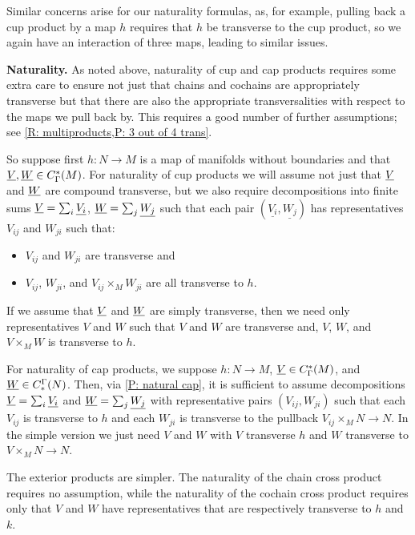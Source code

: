 Similar concerns arise for our naturality formulas, as, for example, pulling back a cup product by a map $h$ requires that $h$ be transverse to the cup product, so we again have an interaction of three maps, leading to similar issues.

\textbf{Naturality.}
As noted above, naturality of cup and cap products requires some extra care to ensure not just that chains and cochains are appropriately transverse but that there are also the appropriate transversalities with respect to the maps we pull back by.
This requires a good number of further assumptions; see \cref{R: multiproducts,P: 3 out of 4 trans}.

So suppose first $h \colon N \to M$ is a map of manifolds without boundaries and that $\underline{V},\underline{W} \in C^*_{\Gamma}(M)$.
For naturality of cup products we will assume not just that $\underline{V}$ and $\underline{W}$ are compound transverse, but we also require decompositions into finite sums $\underline{V} = \sum_i \underline{V_i}$, $\underline{W} = \sum_j \underline{W_j}$ such that each pair $(\underline{V_i},\underline{W_j})$ has representatives $V_{ij}$ and $W_{ji}$ such that:
\begin{itemize}
	\item $V_{ij}$ and $W_{ji}$ are transverse and
	\item $V_{ij}$, $W_{ji}$, and $V_{ij} \times_M W_{ji}$ are all transverse to $h$.
\end{itemize}
If we assume that $\underline{V}$ and $\underline{W}$ are simply transverse, then we need only representatives $V$ and $W$ such that $V$ and $W$ are transverse and, $V$, $W$, and $V \times_M W$ is transverse to $h$.

For naturality of cap products, we suppose $h \colon N \to M$, $\underline{V} \in C^*_\Gamma(M)$, and $\underline{W} \in C_*^\Gamma(N)$.
Then, via \cref{P: natural cap}, it is sufficient to assume decompositions $\underline{V} = \sum_i \underline{V_i}$ and $\underline{W} = \sum_j \underline{W_j}$ with representative pairs $(V_{ij}, W_{ji})$ such that each $V_{ij}$ is transverse to $h$ and each $W_{ji}$ is transverse to the pullback $V_{ij} \times_M N \to N$.
In the simple version we just need $V$ and $W$ with $V$ transverse $h$ and $W$ transverse to $V \times_M N \to N$.

The exterior products are simpler.
The naturality of the chain cross product requires no assumption, while the naturality of the cochain cross product requires only that $V$ and $W$ have representatives that are respectively transverse to $h$ and $k$.


